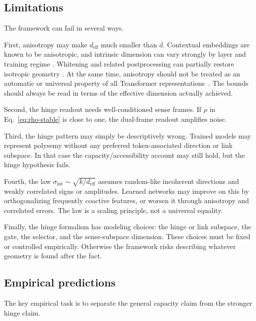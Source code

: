 \documentclass[
  aps,
  reprint,
  superscriptaddress,
  floatfix,
  nofootinbib,
  longbibliography
]{revtex4-2}
\newcommand{\deff}{d_{\mathrm{eff}}}
\newcommand{\sint}{\sigma_{\mathrm{int}}}
\begin{document}
\subsection{Limitations}
\label{sec:limitations}

The framework can fail in several ways.

First, anisotropy may make $\deff$ much smaller than $d$.
Contextual embeddings are known to be anisotropic, and intrinsic
dimension can vary strongly by layer and training regime
\cite{ethayarajh2019,gao2019representation,mu2018allbutthetop,razzhigaev2024shape}. Whitening and
related postprocessing can partially restore isotropic geometry
\cite{gao2019representation,mu2018allbutthetop,su2021whitening}. At the same time, anisotropy should not
be treated as an automatic or universal property of all Transformer
representations~\cite{machina2024anisotropy}. The bounds should always
be read in terms of the effective dimension actually achieved.

Second, the hinge readout needs well-conditioned sense frames. If
$\rho$ in Eq.~\eqref{eq:rho-stable} is close to one, the dual-frame
readout amplifies noise.

Third, the hinge pattern may simply be descriptively wrong. Trained
models may represent polysemy without any preferred token-associated
direction or link subspace. In that case the capacity/accessibility
account may still hold, but the hinge hypothesis fails.

Fourth, the law $\sint\sim\sqrt{k/\deff}$ assumes random-like
incoherent directions and weakly correlated signs or amplitudes.
Learned networks may improve on this by orthogonalizing frequently
coactive features, or worsen it through anisotropy and correlated
errors. The law is a scaling principle, not a universal equality.

Finally, the hinge formalism has modeling choices: the hinge or link
subspace, the gate, the selector, and the sense-subspace dimension.
These choices must be fixed or controlled empirically. Otherwise the
framework risks describing whatever geometry is found after the fact.

\subsection{Empirical predictions}
\label{sec:predictions}

The key empirical task is to separate the general capacity claim from
the stronger hinge claim.
\end{document}
